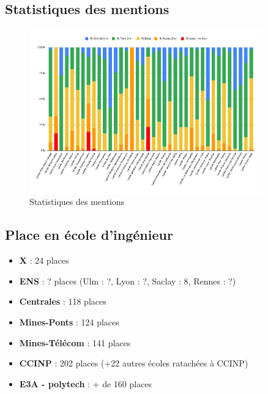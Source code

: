 \documentclass{beamer}
\begin{document}
\subsection{Statistiques des mentions}

\begin{frame}
    \begin{figure}
        \centering
        \includegraphics[width=0.9\textwidth]{ressource_diapo/mention 2023-2024.png}
        \caption{Statistiques des mentions}
    \end{figure}
\end{frame}

\subsection{Place en école d'ingénieur}

\begin{frame}
    \begin{itemize}
        \item \textbf{X} : 24 places
        \item \textbf{ENS} : ? places (Ulm : ?, Lyon : ?, Saclay : 8, Rennes : ?)
        \item \textbf{Centrales} : 118 places
        \item \textbf{Mines-Ponts} : 124 places
        \item \textbf{Mines-Télécom} : 141 places
        \item \textbf{CCINP} : 202 places (+22 autres écoles ratachées à CCINP)
        \item \textbf{E3A - polytech} : + de 160 places
    \end{itemize}
\end{frame}
\end{document}
